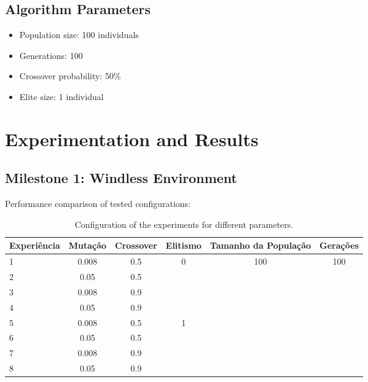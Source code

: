 \documentclass{article}
\begin{document}
\subsection{Algorithm Parameters}
\begin{itemize}
    \item Population size: 100 individuals
    \item Generations: 100
    \item Crossover probability: 50\%
    \item Elite size: 1 individual
\end{itemize}

\section{Experimentation and Results}
\subsection{Milestone 1: Windless Environment}
Performance comparison of tested configurations:

\begin{table}[h]
\centering
\begin{tabular}{|l|c|c|c|c|c|}
\hline
\textbf{Experiência} & \textbf{Mutação} & \textbf{Crossover} & \textbf{Elitismo} & \textbf{Tamanho da População} & \textbf{Gerações} \\ 
\hline
1 & 0.008 & 0.5 & \multirow{4}{*}{0} & \multirow{8}{*}{100} & \multirow{8}{*}{100} \\ 
\cline{1-3}
2 & 0.05 & 0.5 & & & \\ 
\cline{1-3}
3 & 0.008 & 0.9 & & & \\ 
\cline{1-3}
4 & 0.05 & 0.9 & & & \\ 
\cline{1-4}
5 & 0.008 & 0.5 & \multirow{4}{*}{1} & & \\ 
\cline{1-3}
6 & 0.05 & 0.5 & & & \\ 
\cline{1-3}
7 & 0.008 & 0.9 & & & \\ 
\cline{1-3}
8 & 0.05 & 0.9 & & & \\ 
\hline
\end{tabular}

\caption{Configuration of the experiments for different parameters.}
\end{table}
\end{document}
